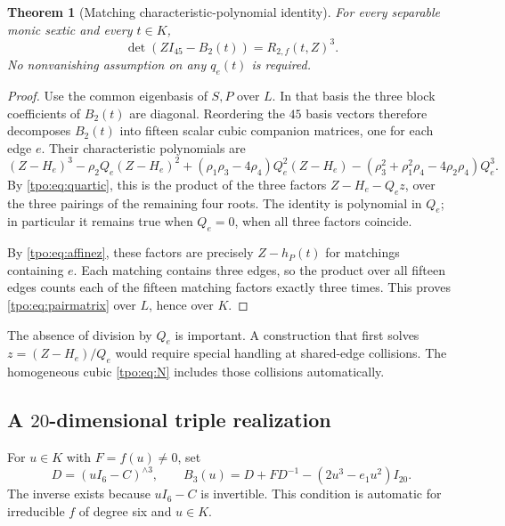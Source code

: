 \documentclass[11pt,letterpaper]{article}
\numberwithin{equation}{section}
\newtheorem{theorem}{Theorem}[section]
\theoremstyle{definition}
\theoremstyle{remark}
\newcommand{\Rtwo}{R_{2,f}}
\begin{document}
\begin{theorem}[Matching characteristic-polynomial identity]
\label{tpo:thm:pairmatrix}
For every separable monic sextic and every $t\in K$,
\begin{equation}
 \det(ZI_{45}-B_2(t))=\Rtwo(t,Z)^3.
 \label{tpo:eq:pairmatrix}
\end{equation}
No nonvanishing assumption on any $q_e(t)$ is required.
\end{theorem}
\begin{proof}
Use the common eigenbasis of $S,P$ over $L$. In that basis the three block
coefficients of $B_2(t)$ are diagonal. Reordering the $45$ basis vectors
therefore decomposes $B_2(t)$ into fifteen scalar cubic companion matrices,
one for each edge $e$. Their characteristic polynomials are
\[
 (Z-H_e)^3-\rho_2Q_e(Z-H_e)^2
    +(\rho_1\rho_3-4\rho_4)Q_e^2(Z-H_e)
    -(\rho_3^2+\rho_1^2\rho_4-4\rho_2\rho_4)Q_e^3.
\]
By \eqref{tpo:eq:quartic}, this is the product of the three factors
$Z-H_e-Q_e z$, over the three pairings of the remaining four roots.
The identity is polynomial in $Q_e$; in particular it remains true when
$Q_e=0$, when all three factors coincide.

By \eqref{tpo:eq:affinez}, these factors are precisely $Z-h_P(t)$ for matchings
containing $e$. Each matching contains three edges, so the product over all
fifteen edges counts each of the fifteen matching factors exactly three
times. This proves \eqref{tpo:eq:pairmatrix} over $L$, hence over $K$.
\end{proof}

The absence of division by $Q_e$ is important. A construction that first solves
$z=(Z-H_e)/Q_e$ would require special handling at shared-edge collisions. The
homogeneous cubic \eqref{tpo:eq:N} includes those collisions automatically.

\subsection{A $20$-dimensional triple realization}
For $u\in K$ with $F=f(u)\ne0$, set
\begin{equation}
 D=(uI_6-C)^{\wedge3},\qquad
 B_3(u)=D+FD^{-1}-(2u^3-e_1u^2)I_{20}.
 \label{tpo:eq:B3}
\end{equation}
The inverse exists because $uI_6-C$ is invertible. This condition is automatic
for irreducible $f$ of degree six and $u\in K$.
\end{document}
